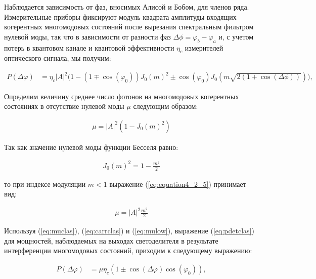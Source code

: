Наблюдается зависимость от фаз, вносимых Алисой и Бобом, для членов ряда. Измерительные приборы фиксируют модуль квадрата амплитуды входящих когерентных многомодовых состояний после вырезания спектральным фильтром нулевой моды, так что в зависимости от разности фаз $\Delta \phi = \varphi_b-\varphi_a$ и, с учетом потерь в квантовом канале и квантовой эффективности $\eta_c$ измерителей оптического сигнала, мы получим:

\begin{equation}
	\begin{aligned}
	\label{eq:pdetclas}
 		P(\Delta\varphi)&=\eta_c |A|^2 \Big(1-(1\mp\cos(\varphi_0)) J_{0}(m)^2 \pm \cos(\varphi_0) J_{0}(m\sqrt{2(1+\cos(\Delta\phi))}) \Big),
	\end{aligned}
\end{equation} 

Определим величину среднее число фотонов на многомодовых когерентных состояниях в отсутствие нулевой моды $\mu$ следующим образом: 

\begin{equation}
	\begin{aligned}
	\label{eq:muclas}
		\mu = |A|^2 (1-J_{0}(m)^2)	
	\end{aligned}
\end{equation}

Так как значение нулевой моды функции Бесселя равно:

\begin{equation}
	\begin{aligned}
	\label{eq:carrclas}
		J_{0}(m)^2 = 1-\frac{m^2}{2} 	
	\end{aligned}
\end{equation}

то при индексе модуляции $m < 1$  выражение (\ref{eq:equation4_2_5}) принимает вид:

\begin{equation}
	\begin{aligned}
	\label{eq:mulow}
		\mu = |A|^2 \frac{m^2}{2}
	\end{aligned}
\end{equation}


Используя (\ref{eq:muclas}), (\ref{eq:carrclas}) и (\ref{eq:mulow}), выражение (\ref{eq:pdetclas}) для мощностей, наблюдаемых на выходах светоделителя в результате интерференции многомодовых состояний, приходим к следующему выражению: 

\begin{equation}
	\begin{aligned} 
	\label{eq:pinterf}
 		P(\Delta\varphi)&=\mu\eta_c(1\pm\cos(\Delta\varphi)\cos(\varphi_0)),
	\end{aligned}
\end{equation}

